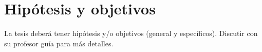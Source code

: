 \chapter{Hipótesis y objetivos} %
\label{sec:Hipotesis} %

La tesis deberá tener hipótesis y/o objetivos (general y específicos). Discutir con su profesor guía para más detalles.